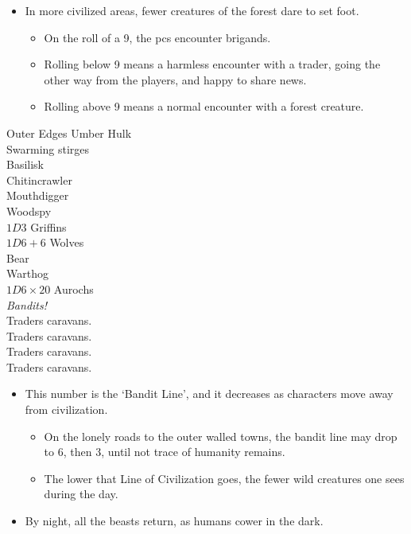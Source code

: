 \begin{multicols}{2}
\begin{itemize}
  \item
  In more civilized areas, fewer creatures of the forest dare to set foot.
  \begin{itemize}
    \item
    On the roll of a 9, the \glspl{pc} encounter brigands.
    \item
    Rolling below 9 means a harmless encounter with a trader, going the other way from the players, and happy to share news.
    \item
    Rolling above 9 means a normal encounter with a forest creature.
  \end{itemize}
\end{itemize}

\columnbreak

\begin{encChart}{Outer Edges}
  \encLine Umber Hulk \\
  \encLine Swarming stirges \\
  \encLine Basilisk \\
  \encLine Chitincrawler \\
  \encLine Mouthdigger \\
  \encLine Woodspy \\
  \encLine $1D3$ Griffins \\
  \encLine $1D6+6$ Wolves \\
  \encLine Bear \\
  \encLine Warthog \\
  \encLine $1D6\times 20$ Aurochs \\
  \hline
  \encLine \textit{Bandits!} \\
  \hline
  \encLine {} Traders caravans. \\
  \encLine {} Traders caravans. \\
  \encLine {} Traders caravans. \\
  \encLine {} Traders caravans. \\
\end{encChart}

\begin{itemize}
  \item
  This number is the `Bandit Line', and it decreases as characters move away from civilization.
  \begin{itemize}
    \item
    On the lonely roads to the outer walled towns, the bandit line may drop to 6, then 3, until not trace of humanity remains.
    \item
    The lower that Line of Civilization goes, the fewer wild creatures one sees during the day.
  \end{itemize}
  \item
  By night, all the beasts return, as humans cower in the dark.
\end{itemize}


\end{multicols}
